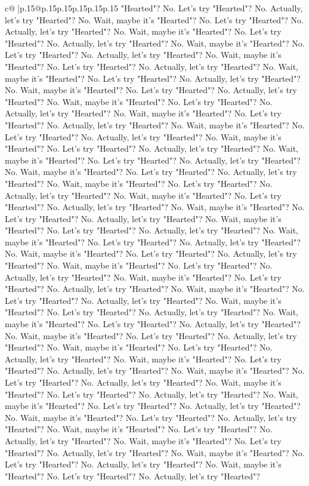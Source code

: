 \documentclass{article}
\begin{document}
{\begin{supertabular}{c@{$\;$}|p{.15\linewidth}@{}p{.15\linewidth}p{.15\linewidth}p{.15\linewidth}p{.15\linewidth}p{.15\linewidth}}
{{{"Hearted"? No. Let's try "Hearted"? No. Actually, let's try "Hearted"? No. Wait, maybe it's "Hearted"? No. Let's try "Hearted"? No. Actually, let's try "Hearted"? No. Wait, maybe it's "Hearted"? No. Let's try "Hearted"? No. Actually, let's try "Hearted"? No. Wait, maybe it's "Hearted"? No. Let's try "Hearted"? No. Actually, let's try "Hearted"? No. Wait, maybe it's "Hearted"? No. Let's try "Hearted"? No. Actually, let's try "Hearted"? No. Wait, maybe it's "Hearted"? No. Let's try "Hearted"? No. Actually, let's try "Hearted"? No. Wait, maybe it's "Hearted"? No. Let's try "Hearted"? No. Actually, let's try "Hearted"? No. Wait, maybe it's "Hearted"? No. Let's try "Hearted"? No. Actually, let's try "Hearted"? No. Wait, maybe it's "Hearted"? No. Let's try "Hearted"? No. Actually, let's try "Hearted"? No. Wait, maybe it's "Hearted"? No. Let's try "Hearted"? No. Actually, let's try "Hearted"? No. Wait, maybe it's "Hearted"? No. Let's try "Hearted"? No. Actually, let's try "Hearted"? No. Wait, maybe it's "Hearted"? No. Let's try "Hearted"? No. Actually, let's try "Hearted"? No. Wait, maybe it's "Hearted"? No. Let's try "Hearted"? No. Actually, let's try "Hearted"? No. Wait, maybe it's "Hearted"? No. Let's try "Hearted"? No. Actually, let's try "Hearted"? No. Wait, maybe it's "Hearted"? No. Let's try "Hearted"? No. Actually, let's try "Hearted"? No. Wait, maybe it's "Hearted"? No. Let's try "Hearted"? No. Actually, let's try "Hearted"? No. Wait, maybe it's "Hearted"? No. Let's try "Hearted"? No. Actually, let's try "Hearted"? No. Wait, maybe it's "Hearted"? No. Let's try "Hearted"? No. Actually, let's try "Hearted"? No. Wait, maybe it's "Hearted"? No. Let's try "Hearted"? No. Actually, let's try "Hearted"? No. Wait, maybe it's "Hearted"? No. Let's try "Hearted"? No. Actually, let's try "Hearted"? No. Wait, maybe it's "Hearted"? No. Let's try "Hearted"? No. Actually, let's try "Hearted"? No. Wait, maybe it's "Hearted"? No. Let's try "Hearted"? No. Actually, let's try "Hearted"? No. Wait, maybe it's "Hearted"? No. Let's try "Hearted"? No. Actually, let's try "Hearted"? No. Wait, maybe it's "Hearted"? No. Let's try "Hearted"? No. Actually, let's try "Hearted"? No. Wait, maybe it's "Hearted"? No. Let's try "Hearted"? No. Actually, let's try "Hearted"? No. Wait, maybe it's "Hearted"? No. Let's try "Hearted"? No. Actually, let's try "Hearted"? No. Wait, maybe it's "Hearted"? No. Let's try "Hearted"? No. Actually, let's try "Hearted"? No. Wait, maybe it's "Hearted"? No. Let's try "Hearted"? No. Actually, let's try "Hearted"? No. Wait, maybe it's "Hearted"? No. Let's try "Hearted"? No. Actually, let's try "Hearted"? No. Wait, maybe it's "Hearted"? No. Let's try "Hearted"? No. Actually, let's try "Hearted"? No. Wait, maybe it's "Hearted"? No. Let's try "Hearted"? No. Actually, let's try "Hearted"? No. Wait, maybe it's "Hearted"? No. Let's try "Hearted"? No. Actually, let's try "Hearted"? No. Wait, maybe it's "Hearted"? No. Let's try "Hearted"? No. Actually, let's try "Hearted"? No. Wait, maybe it's "Hearted"? No. Let's try "Hearted"? No. Actually, let's try "Hearted"? No. Wait, maybe it's "Hearted"? No. Let's try "Hearted"? No. Actually, let's try "Hearted"? }}}
\end{supertabular}}
\end{document}
